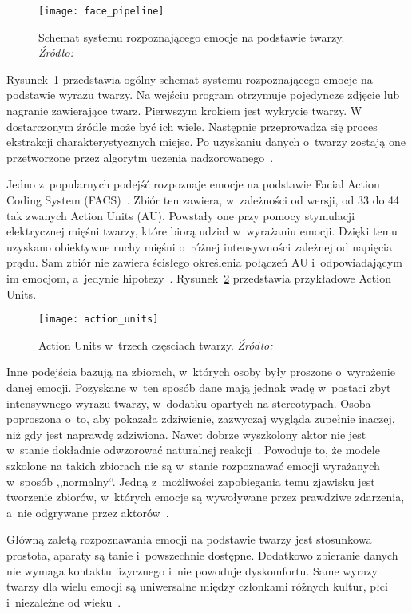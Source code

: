 \begin{figure}[h]
    \centering
    \texttt{[image: face\_pipeline]}
    \caption{Schemat systemu rozpoznającego emocje na podstawie twarzy. \textit{Źródło:~\cite{Ko2018}}}
    \label{fig:face-pipeline}
\end{figure}

Rysunek~\ref{fig:face-pipeline} przedstawia ogólny schemat systemu rozpoznającego emocje na podstawie wyrazu twarzy.
Na wejściu program otrzymuje pojedyncze zdjęcie lub nagranie zawierające twarz.
Pierwszym krokiem jest wykrycie twarzy.
W dostarczonym źródle może być ich wiele.
Następnie przeprowadza się proces ekstrakcji charakterystycznych miejsc.
Po uzyskaniu danych o~twarzy zostają one przetworzone przez algorytm uczenia nadzorowanego~\cite{Calvo2015}.

Jedno z~popularnych podejść rozpoznaje emocje na podstawie Facial Action Coding System (FACS)~\cite{Ekman1978}.
Zbiór ten zawiera, w~zależności od wersji, od 33 do 44 tak zwanych Action Units (AU).
Powstały one przy pomocy stymulacji elektrycznej mięśni twarzy, które biorą udział w~wyrażaniu emocji.
Dzięki temu uzyskano obiektywne ruchy mięśni o~różnej intensywności zależnej od napięcia prądu.
Sam zbiór nie zawiera ścisłego określenia połączeń AU i~odpowiadającym im emocjom, a~jedynie hipotezy~\cite{Calvo2015}.
Rysunek~\ref{fig:action-units} przedstawia przykładowe Action Units.

\begin{figure}[h]
    \centering
    \texttt{[image: action\_units]}
    \caption{Action Units w~trzech częsciach twarzy. \textit{Źródło:~\cite{Ko2018}}}
    \label{fig:action-units}
\end{figure}

Inne podejścia bazują na zbiorach, w~których osoby były proszone o~wyrażenie danej emocji.
Pozyskane w~ten sposób dane mają jednak wadę w~postaci zbyt intensywnego wyrazu twarzy, w~dodatku opartych na stereotypach.
Osoba poproszona o~to, aby pokazała zdziwienie, zazwyczaj wygląda zupełnie inaczej, niż gdy jest naprawdę zdziwiona.
Nawet dobrze wyszkolony aktor nie jest w~stanie dokładnie odwzorować naturalnej reakcji~\cite{Calvo2015}.
Powoduje to, że modele szkolone na takich zbiorach nie są w~stanie rozpoznawać emocji wyrażanych w~sposób ,,normalny``.
Jedną z~możliwości zapobiegania temu zjawisku jest tworzenie zbiorów, w~których emocje są wywoływane przez prawdziwe zdarzenia, a~nie odgrywane przez aktorów~\cite{Calvo2015}.

Główną zaletą rozpoznawania emocji na podstawie twarzy jest stosunkowa prostota, aparaty są tanie i~powszechnie dostępne.
Dodatkowo zbieranie danych nie wymaga kontaktu fizycznego i~nie powoduje dyskomfortu.
Same wyrazy twarzy dla wielu emocji są uniwersalne między członkami różnych kultur, płci i~niezależne od wieku~\cite{Calvo2015}.

